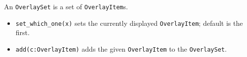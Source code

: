 \medskip{}

An  \texttt{OverlaySet} is a set of  \texttt{OverlayItem}s.

\begin{itemize}
\item\noindent\texttt{set\_which\_one(x)} sets the currently displayed  \texttt{OverlayItem};
default is the first.

\item\noindent\texttt{add(c:OverlayItem)} adds the given  \texttt{OverlayItem} to the  \texttt{OverlaySet}.
\end{itemize}
